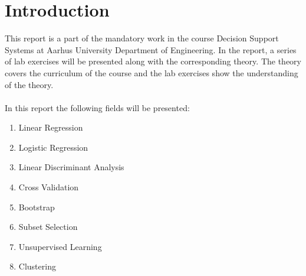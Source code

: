 \chapter{Introduction}
\label{chp:intro}

This report is a part of the mandatory work in the course Decision Support Systems at Aarhus University Department of Engineering.
In the report, a series of lab exercises will be presented along with the corresponding theory. 
The theory covers the curriculum of the course and the lab exercises show the understanding of the theory. 
\\
\\
In this report the following fields will be presented:
\begin{enumerate}  
	\item Linear Regression
	\item Logistic Regression
	\item Linear Discriminant Analysis
	\item Cross Validation
	\item Bootstrap
	\item Subset Selection
	\item Unsupervised Learning
	\item Clustering 
\end{enumerate} 
